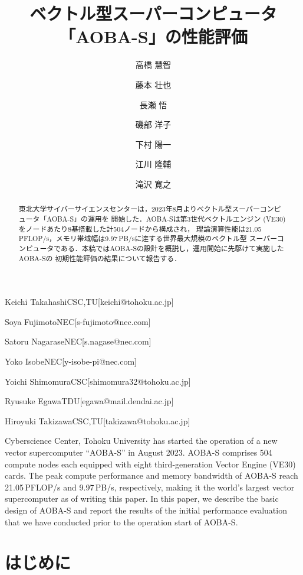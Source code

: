 ﻿\documentclass[submit,techrep,noauthor]{ipsj}
\begin{document}
\title{ベクトル型スーパーコンピュータ「AOBA-S」の性能評価}



\author{高橋 慧智}{Keichi Takahashi}{CSC,TU}[keichi@tohoku.ac.jp]
\author{藤本 壮也}{Soya Fujimoto}{NEC}[s-fujimoto@nec.com]
\author{長瀬 悟}{Satoru Nagarase}{NEC}[s.nagase@nec.com]
\author{磯部 洋子}{Yoko Isobe}{NEC}[y-isobe-pi@nec.com]
\author{下村 陽一}{Yoichi Shimomura}{CSC}[shimomura32@tohoku.ac.jp]
\author{江川 隆輔}{Ryusuke Egawa}{TDU}[egawa@mail.dendai.ac.jp]
\author{滝沢 寛之}{Hiroyuki Takizawa}{CSC,TU}[takizawa@tohoku.ac.jp]

\begin{abstract}
東北大学サイバーサイエンスセンターは，2023年8月よりベクトル型スーパーコンピュータ「AOBA-S」の運用を
開始した．AOBA-Sは第3世代ベクトルエンジン (VE30) をノードあたり8基搭載した計504ノードから構成され，
理論演算性能は21.05\,PFLOP/s，メモリ帯域幅は9.97\,PB/sに達する世界最大規模のベクトル型
スーパーコンピュータである．本稿ではAOBA-Sの設計を概説し，運用開始に先駆けて実施したAOBA-Sの
初期性能評価の結果について報告する．
\end{abstract}

\begin{eabstract}
Cyberscience Center, Tohoku University has started the operation of a new vector supercomputer 
``AOBA-S'' in August 2023. AOBA-S comprises 504 compute nodes each equipped with eight
third-generation Vector Engine (VE30) cards. The peak compute performance and memory bandwidth of
AOBA-S reach 21.05\,PFLOP/s and 9.97\,PB/s, respectively, making it the world's largest vector
supercomputer as of writing this paper. In this paper, we describe the basic design of AOBA-S and
report the results of the initial performance evaluation that we have conducted prior to the
operation start of AOBA-S.
\end{eabstract}

\maketitle

\section{はじめに}
\end{document}

